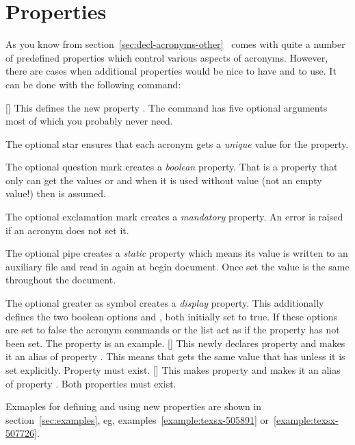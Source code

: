 \documentclass{acro-manual}
\begin{document}
\section{Properties}\label{sec:new-properties}
As you know from section~\ref{sec:decl-acronyms-other} \acro\ comes with quite
a number of predefined properties which control various aspects of
acronyms. However, there are cases when additional properties would be nice to
have and to use. It can be done with the following command:
\begin{commands}
  [\sarg{}\arg{!}\arg{|}\arg{>}]
    This defines the new property .  The command has five optional
    arguments most of which you probably never need. \par
    The optional star \sym{*} ensures that each acronym gets a \emph{unique}
    value for the property. \par
    The optional question mark  creates a \emph{boolean} property.
    That is a property that only can get the values  or
     and when it is used without value (not an empty value!) then
     is assumed. \par
    The optional exclamation mark \sym{!} creates a \emph{mandatory}
    property. An error is raised if an acronym does not set it. \par
    The optional pipe \sym{|} creates a \emph{static} property which means
    its value is written to an auxiliary file and read in again at begin
    document.  Once set the value is the same throughout the document. \par
    The optional greater as symbol \sym{>} creates a
    \emph{display} property.  This additionally defines the two boolean
    options \code{/} and
    \code{/}\code{/}, both initially
    set to true.  If these options are set to false the acronym commands or
    the list act as if the property  has not been set.  The
     property is an example.
  [\sarg{}\arg{!}\arg{|}\arg{>}]
    This newly declares property  and makes it an alias of
    property .  This means that  gets the same value
    that  has unless it is set explicitly.  Property 
    must exist.
  []
    This makes property  and makes it an alias of property
    . Both properties must exist.
\end{commands}
Exmaples for defining and using new properties are shown in
section~\ref{sec:examples}, \ac*{eg}, examples~\ref{example:texsx-505891}
or~\ref{example:texsx-507726}.
\end{document}
